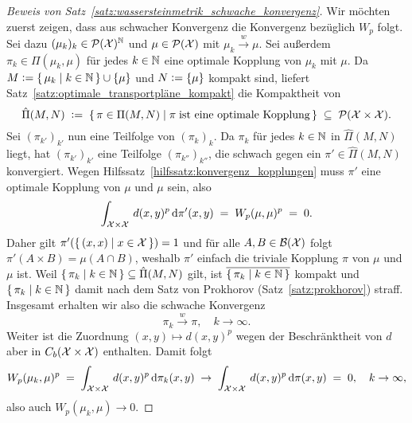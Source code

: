 \documentclass[../thesis/thesis.tex]{subfiles}
\begin{document}
\begin{proof}[Beweis von Satz~\ref{satz:wassersteinmetrik_schwache_konvergenz}]
		Wir möchten zuerst zeigen, dass aus schwacher Konvergenz die Konvergenz bezüglich $W_p$ folgt. Sei dazu $(\mu_k)_k \in \mathcal{P}(\mathcal{X})^{\mathbb{N}}$ und $\mu \in \mathcal{P}(\mathcal{X})$ mit $\mu_k \xrightarrow{w} \mu$. Sei außerdem $\pi_k \in \Pi(\mu_k, \mu)$ 
		für jedes $k \in \mathbb{N}$ eine optimale Kopplung von $\mu_k$ mit $\mu$. 
		Da $M \vcentcolon = \left\{\, \mu_k \; \middle| \; k \in \mathbb{N} \,\right\} \cup \left\{\mu\right\}$ und $N \vcentcolon = \left\{\mu\right\}$ kompakt sind, liefert Satz~\ref{satz:optimale_transportpläne_kompakt} die Kompaktheit von
		\[ \hat{\Pi}(M, N) \; \vcentcolon = \; \left\{\, \pi \in \Pi(M, N) \; \middle| \; \pi \; \text{ist eine optimale Kopplung} \,\right\} \; \subseteq \; \mathcal{P}(\mathcal{X} \times \mathcal{X}) \text{.} \]
		Sei $(\pi_{k'})_{k'}$ nun eine Teilfolge von $(\pi_k)_k$. Da $\pi_k$ für jedes $k \in \mathbb{N}$ in $\hat{\Pi}(M, N)$ liegt, hat $(\pi_{k'})_{k'}$ eine Teilfolge $(\pi_{k''})_{k''}$, 
		die schwach gegen ein $\pi' \in \hat{\Pi}(M, N)$ konvergiert. Wegen Hilfssatz~\ref{hilfssatz:konvergenz_kopplungen} muss $\pi'$ eine optimale Kopplung von $\mu$ und $\mu$ sein, also
		\[ \int_{\mathcal{X} \times \mathcal{X}} \, d(x, y)^p \, \mathrm{d}\pi'(x, y) \; = \; W_p(\mu, \mu)^p \; = \; 0 \text{.} \]
		Daher gilt $\pi'(\left\{\, (x, x) \; \middle| \; x \in \mathcal{X} \,\right\}) = 1$ und für alle $A, B \in \mathcal{B}(\mathcal{X})$ folgt $\pi'(A \times B) = \mu(A \cap B)$, weshalb $\pi'$ einfach die 
		triviale Kopplung $\pi$ von $\mu$ und $\mu$ ist. Weil $\left\{\, \pi_k \; \middle| \; k \in \mathbb{N} \,\right\} \subseteq \hat{\Pi}(M, N)$ gilt, ist $\overline{\left\{\, \pi_k \; \middle| \; k \in \mathbb{N} \,\right\}}$ kompakt und $\left\{\, \pi_k \; \middle| \; k \in \mathbb{N} \,\right\}$ damit nach
		dem Satz von Prokhorov (Satz~\ref{satz:prokhorov}) straff. Insgesamt erhalten wir also die schwache Konvergenz
		\[ \pi_k \xrightarrow{w} \pi, \quad k \to \infty \text{.} \] 
		Weiter ist die Zuordnung $(x, y) \mapsto d(x, y)^p$ wegen der Beschränktheit von $d$ aber in $C_b(\mathcal{X} \times \mathcal{X})$ enthalten. Damit folgt 
		\[ W_p(\mu_k, \mu)^p \; = \; \int_{\mathcal{X} \times \mathcal{X}} \, d(x, y)^p \, \mathrm{d}\pi_k(x, y) \; \to \; \int_{\mathcal{X} \times \mathcal{X}} \, d(x, y)^p \, \mathrm{d}\pi(x, y) \; = \; 0, \quad k \to \infty \text{,} \]
		also auch $W_p(\mu_k, \mu) \to 0$.
		

\end{proof}
\end{document}
